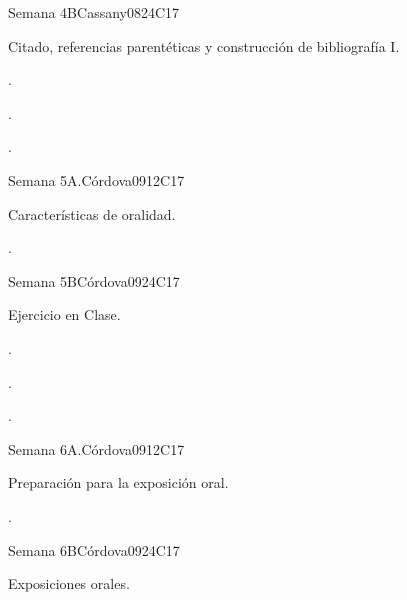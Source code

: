 \begin{syllabus}
\begin{unit}{Semana 4B}{}{Cassany08}{24}{C17}
   \begin{topics}
      \item Citado, referencias parentéticas y construcción de bibliografía I.
   \end{topics}

   \begin{learningoutcomes}
      \item . 
      \item .
      \item . 
      \end{learningoutcomes}
\end{unit}

\begin{unit}{Semana 5A.}{}{Córdova09}{12}{C17}
   \begin{topics}
      \item Características de oralidad.
   \end{topics}
   \begin{learningoutcomes}
      \item . 
   \end{learningoutcomes}
\end{unit}

\begin{unit}{Semana 5B}{}{Córdova09}{24}{C17}
   \begin{topics}
      \item Ejercicio en Clase.
   \end{topics}

   \begin{learningoutcomes}
      \item . 
      \item .
      \item . 
      \end{learningoutcomes}
\end{unit}

\begin{unit}{Semana 6A.}{}{Córdova09}{12}{C17}
   \begin{topics}
      \item Preparación para la exposición oral. 
   \end{topics}
   \begin{learningoutcomes}
      \item . 
   \end{learningoutcomes}
\end{unit}

\begin{unit}{Semana 6B}{}{Córdova09}{24}{C17}
   \begin{topics}
      \item Exposiciones orales.
   \end{topics}


\end{unit}
\end{syllabus}
